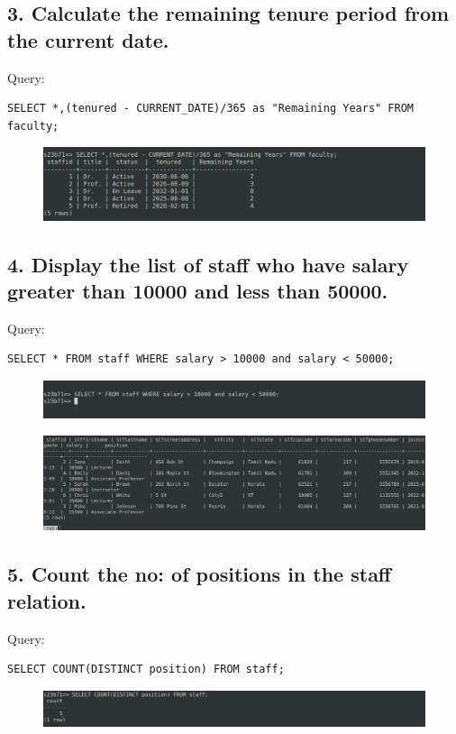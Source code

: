 \documentclass{article}
\begin{document}
\subsection*{3. Calculate the remaining tenure period from the current date.}
Query:
\begin{Verbatim}[frame=single,framerule=1pt,fontfamily=courier,fontsize=\small]
SELECT *,(tenured - CURRENT_DATE)/365 as "Remaining Years" FROM faculty;
\end{Verbatim}
\begin{figure}[H]
    \centering
    \includegraphics[width=\textwidth]{cycle2/2.3.png}
\end{figure}

\subsection*{4. Display the list of staff who have salary greater than 10000 and less than 50000.}
Query:
\begin{Verbatim}[frame=single,framerule=1pt,fontfamily=courier,fontsize=\small]
SELECT * FROM staff WHERE salary > 10000 and salary < 50000;
\end{Verbatim}
\begin{figure}[H]
    \centering
    \includegraphics[width=\textwidth]{cycle2/2.4.1.png}
\end{figure}
\begin{figure}[H]
    \centering
    \includegraphics[width=\textwidth]{cycle2/2.4.2.png}
\end{figure}

\subsection*{5. Count the no: of positions in the staff relation.}
Query:
\begin{Verbatim}[frame=single,framerule=1pt,fontfamily=courier,fontsize=\small]
SELECT COUNT(DISTINCT position) FROM staff;
\end{Verbatim}
\begin{figure}[H]
    \centering
    \includegraphics[width=\textwidth]{cycle2/2.5.png}
\end{figure}
\end{document}
